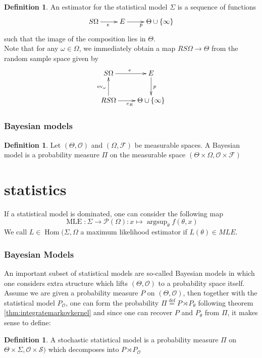 \documentclass{book}
\theoremstyle{plain}
\theoremstyle{definition}
\newtheorem{definition}[corollary]{Definition}
\DeclareMathOperator{\argsup}{argsup}
\newcommand{\define}{\stackrel{\operatorname{def}}{=}}
\newcommand{\fun}{\mapsto}
\DeclareMathOperator{\ev}{ev}
\DeclareMathOperator{\Hom}{Hom}
\DeclareMathOperator{\MLE}{MLE}
\newcommand{\mor}{\longrightarrow}
\renewcommand{\r}[1]{\mathcal{#1}}
\renewcommand{\r}[1]{\mathcal{#1}}
\begin{document}
\begin{definition}\label{stats:def.estimators}
An estimator for the statistical model $\Sigma$ is a sequence of functions
\begin{displaymath}
\xymatrix{
S\Omega\ar[r]_{e} & E\ar[r]_p  & \Theta \cup \{\infty\}
}
\end{displaymath}
such that the image of the composition lies in $\Theta$.\\
Note that for any $\omega \in \Omega$, we immediately obtain a map $RS\Omega\mor \Theta$ from the random sample space given by
\begin{displaymath}
\xymatrix{
S\ar[r]^e\Omega & E\ar[d]^p\\
RS\ar[u]^{\ev_{\omega}}\ar[r]_{e_R}\Omega & \Theta\cup\{ \infty \}
}
\end{displaymath}
\end{definition}

\section{Bayesian models}


\begin{definition}
Let $(\Theta,\r{O})$ and $(\Omega,\r{F})$ be measurable spaces.
A Bayesian model is a probability measure $\Pi$ on the measurable space $(\Theta\times \Omega, \r{O}\times\r{F})$
\end{definition}

\part{statistics}



If a statistical model is dominated, one can consider the following map
\[
\MLE: \Sigma\mor \r{P}(\Omega):x \fun \argsup_\theta f(\theta,x)
\]
We call $L \in \Hom(\Sigma,\Omega$ a maximum likelihood estimator if $L(\theta)\in MLE$.
\section{Bayesian Models}



An important subset of statistical models are so-called Bayesian models in which one considers extra structure which lifts $(\Theta,\r{O})$ to a probability space itself. Assume we are given a probability measure $P$ on $(\Theta,\r{O})$, then together with the statistical model $P_\r{O}$, one can form the probability $\Pi\define P\rtimes P_\theta$ following theorem \ref{thm:integratemarkovkernel}  and since one can recover $P$ and $P_\theta$ from $\Pi$, it makes sense to define:
\begin{definition}\label{def:stochasticmodel}
A stochastic statistical model is a probability measure $\Pi$ on $\Theta\times \Sigma, \r{O}\times \r{S})$ which decomposes into $P\rtimes P_\r{O}$
\end{definition}
\end{document}

